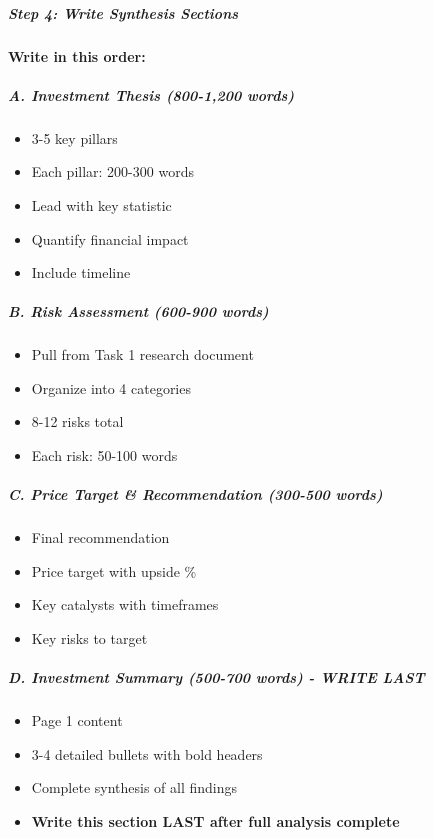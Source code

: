 \documentclass[11pt]{article}
\begin{document}
\subparagraph{Step 4: Write Synthesis Sections}\mbox{}\par

\textbf{Write in this order:}


\subparagraph{A. Investment Thesis (800-1,200 words)}\mbox{}\par
\begin{itemize}[leftmargin=*,itemsep=2pt,topsep=2pt]
\item {} 3-5 key pillars
\item {} Each pillar: 200-300 words
\item {} Lead with key statistic
\item {} Quantify financial impact
\item {} Include timeline
\end{itemize}

\subparagraph{B. Risk Assessment (600-900 words)}\mbox{}\par
\begin{itemize}[leftmargin=*,itemsep=2pt,topsep=2pt]
\item {} Pull from Task 1 research document
\item {} Organize into 4 categories
\item {} 8-12 risks total
\item {} Each risk: 50-100 words
\end{itemize}

\subparagraph{C. Price Target \& Recommendation (300-500 words)}\mbox{}\par
\begin{itemize}[leftmargin=*,itemsep=2pt,topsep=2pt]
\item {} Final recommendation
\item {} Price target with upside \%
\item {} Key catalysts with timeframes
\item {} Key risks to target
\end{itemize}

\subparagraph{D. Investment Summary (500-700 words) - WRITE LAST}\mbox{}\par
\begin{itemize}[leftmargin=*,itemsep=2pt,topsep=2pt]
\item {} Page 1 content
\item {} 3-4 detailed bullets with bold headers
\item {} Complete synthesis of all findings
\item {} \textbf{Write this section LAST after full analysis complete}
\end{itemize}
\end{document}
